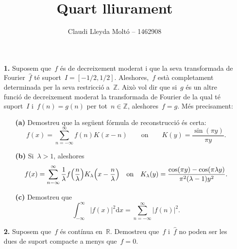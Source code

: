 \documentclass[a4paper]{article}
\title{Quart lliurament}
\author{Claudi Lleyda Moltó -- 1462908}
\theoremstyle{plain}
\providecommand{\uppi}{\pi}
\newcommand{\diff}{\mathrm{d}}
\newcommand{\abs}[1]{\lvert{#1}\rvert}
\newcommand{\ZZ}{\mathbb{Z}}
\newcommand{\RR}{\mathbb{R}}
\begin{document}
\maketitle

\begin{enumerate}
    \item[\textbf{1.}] Suposem que~\(f\) és de decreixement moderat i que la
        seva transformada de Fourier~\(\widehat{f}\) té suport~\(I=[-1/2,1/2]\).
        Aleshores,~\(f\) està completament determinada per la seva restricció
        a~\(\ZZ\).
        Això vol dir que si~\(g\) és un altre funció de decreixement moderat la
        transformada de Fourier de la qual té suport~\(I\) i~\(f(n)=g(n)\) per
        tot~\(n\in\ZZ\), aleshores~\(f=g\).
        Més precisament:
        \begin{enumerate}
            \item[\textbf{(a)}] Demostreu que la següent fórmula de reconstrucció
                és certa:
                \[
                    f(x) = \sum_{n=-\infty}^{\infty} f(n) K(x-n)
                    \qquad\text{on}\qquad
                    K(y) = \frac{\sin(\uppi y)}{\uppi y}.
                \]
        \end{enumerate}
\end{enumerate}

\begin{enumerate}
    \item[]\begin{enumerate}
        \item[\textbf{(b)}] Si~\(\lambda > 1\), aleshores
            \[
                f(x) =
                \sum_{n-\infty}^{\infty}
                \frac{1}{\lambda} f\Bigl(\frac{n}{\lambda}\Bigr)
                K_{\lambda}\Bigl(x-\frac{n}{\lambda}\Bigr)
                \quad\text{on}\quad
                K_{\lambda}(y) =
                \frac{\cos(\uppi y) - \cos(\uppi\lambda y)}
                {\uppi^{2}(\lambda-1)y^{2}}.
            \]
    \end{enumerate}
\end{enumerate}

\begin{enumerate}
    \item[]\begin{enumerate}
        \item[\textbf{(c)}] Demostreu que
            \[
                \int_{-\infty}^{\infty}
                \abs{f(x)}^{2}
                \diff x
                =
                \sum_{n=-\infty}^{\infty}
                \abs{f(n)}^{2}.
            \]
    \end{enumerate}
\end{enumerate}

\begin{enumerate}
    \item[\textbf{2.}] Suposem que~\(f\) és contínua en~\(\RR\).
        Demostreu que~\(f\) i~\(\widehat{f}\) no poden ser les dues de suport
        compacte a menys que~\(f=0\).
\end{enumerate}
\end{document}

